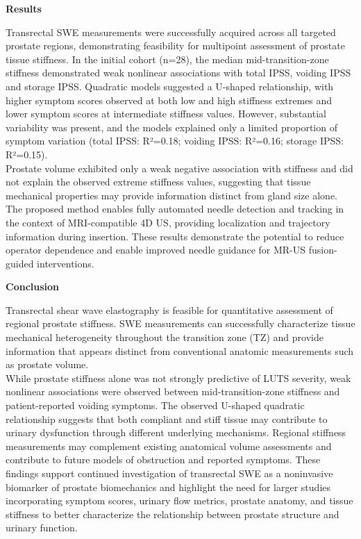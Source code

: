 \documentclass[11 pt,letterpaper]{article}
\begin{document}
\noindent
\textbf{Results}

Transrectal SWE measurements were successfully acquired across all targeted prostate regions, demonstrating feasibility for multipoint assessment of prostate tissue stiffness.
In the initial cohort (n=28), the median mid-transition-zone stiffness demonstrated weak nonlinear associations with total IPSS, voiding IPSS and storage IPSS.
Quadratic models suggested a U-shaped relationship, with higher symptom scores observed at both low and high stiffness extremes and lower symptom scores at intermediate stiffness values.
However, substantial variability was present, and the models explained only a limited proportion of symptom variation (total IPSS: R²=0.18; voiding IPSS: R²=0.16; storage IPSS: R²=0.15).
\\
Prostate volume exhibited only a weak negative association with stiffness and did not explain the observed extreme stiffness values, suggesting that tissue mechanical properties may provide information distinct from gland size alone.
The proposed method enables fully automated needle detection and tracking in the context of MRI-compatible 4D US, providing localization and trajectory information during insertion.
These results demonstrate the potential to reduce operator dependence and enable improved needle guidance for MR-US fusion-guided interventions.

\noindent
\textbf{Conclusion}

Transrectal shear wave elastography is feasible for quantitative assessment of regional prostate stiffness.
SWE measurements can successfully characterize tissue mechanical heterogeneity throughout the transition zone (TZ) and provide information that appears distinct from conventional anatomic measurements such as prostate volume.
\\
While prostate stiffness alone was not strongly predictive of LUTS severity, weak nonlinear associations were observed between mid-transition-zone stiffness and patient-reported voiding symptoms.
The observed U-shaped quadratic relationship suggests that both compliant and stiff tissue may contribute to urinary dysfunction through different underlying mechanisms.
Regional stiffness measurements may complement existing anatomical volume assessments and contribute to future models of obstruction and reported symptoms.
These findings support continued investigation of transrectal SWE as a noninvasive biomarker of prostate biomechanics and highlight the need for larger studies incorporating symptom scores, urinary flow metrics, prostate anatomy, and tissue stiffness to better characterize the relationship between prostate structure and urinary function.

\noindent
\end{document}
